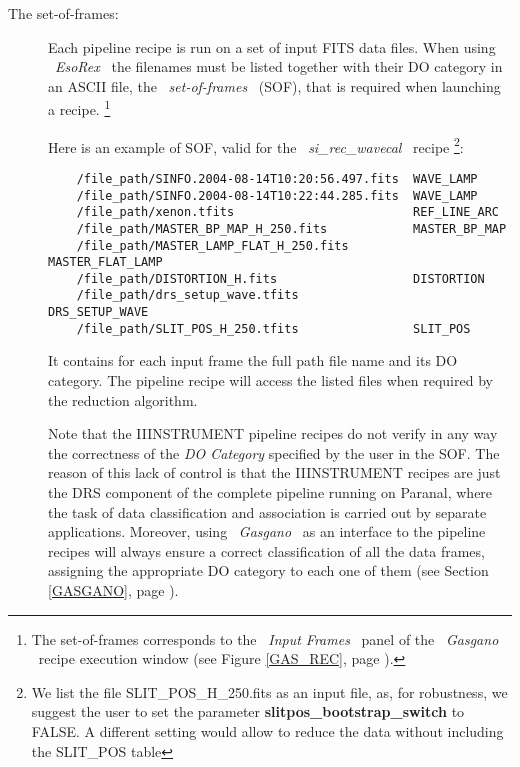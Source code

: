 \begin{description}

\item [The set-of-frames:]
\label{SOF}
Each pipeline recipe is run on a set of input FITS data files. 
When using \ {\it EsoRex} \ the 
filenames must be listed together with their DO category in an ASCII file, 
the \ {\it set-of-frames} \ (SOF), that is required when launching a recipe.
\footnote{The set-of-frames corresponds to the \ {\it Input Frames} \ panel
of the \ {\it Gasgano} \ recipe execution window (see Figure \ref{GAS_REC},
page \pageref{GAS_REC}).}

Here is an example of SOF, valid for the \ {\it si\_rec\_wavecal} \ recipe
\footnote{We list the file SLIT\_POS\_H\_250.fits as an input file, as,
for robustness, we suggest the user to set the parameter 
{\bf slitpos\_bootstrap\_switch} to FALSE. A different setting would allow
to reduce the data without including the SLIT\_POS table}:
\begin{verbatim}
    /file_path/SINFO.2004-08-14T10:20:56.497.fits  WAVE_LAMP
    /file_path/SINFO.2004-08-14T10:22:44.285.fits  WAVE_LAMP
    /file_path/xenon.tfits                         REF_LINE_ARC
    /file_path/MASTER_BP_MAP_H_250.fits            MASTER_BP_MAP
    /file_path/MASTER_LAMP_FLAT_H_250.fits         MASTER_FLAT_LAMP
    /file_path/DISTORTION_H.fits                   DISTORTION
    /file_path/drs_setup_wave.tfits                DRS_SETUP_WAVE
    /file_path/SLIT_POS_H_250.tfits                SLIT_POS
\end{verbatim}

It contains for each input frame the full path file name and its 
DO category.
The pipeline recipe will access the listed files when required 
by the reduction algorithm.

Note that the IIINSTRUMENT pipeline recipes do not verify in any way the 
correctness of the {\it DO Category} specified by the user in the SOF. 
The reason of this lack of control is that the IIINSTRUMENT recipes are just 
the DRS component of the complete pipeline running on Paranal, where 
the task of data classification and association is carried out by 
separate applications. Moreover, using \ {\it Gasgano} \ as
an interface to the pipeline recipes will always ensure a correct
classification of all the data frames, assigning the appropriate 
DO category to each one of them (see Section \ref{GASGANO}, page
\pageref{GASGANO}).


\end{description}
